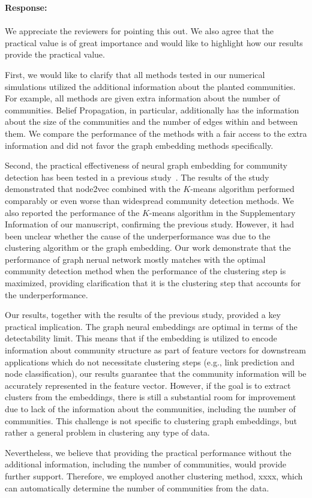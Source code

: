 \documentclass[12pt]{article}
\newcommand{\response}[1]{{\noindent \textbf{Response:} \\ \\ \noindent #1}}
\begin{document}
\response{
We appreciate the reviewers for pointing this out. We also agree that the practical value is of great importance and would like to highlight how our results provide the practical value.

First, we would like to clarify that all methods tested in our numerical simulations utilized the additional information about the planted communities. For example, all methods are given extra information about the number of communities. Belief Propagation, in particular, additionally has the information about the size of the communities and the number of edges within and between them. We compare the performance of the methods with a fair access to the extra information and did not favor the graph embedding methods specifically.

Second, the practical effectiveness of neural graph embedding for community detection has been tested in a previous study~\cite{tandonCommunityDetectionNetworks2021}. The results of the study demonstrated that node2vec combined with the $K$-means algorithm performed comparably or even worse than widespread community detection methods. We also reported the performance of the $K$-means algorithm in the Supplementary Information of our manuscript, confirming the previous study. However, it had been unclear whether the cause of the underperformance was due to the clustering algorithm or the graph embedding.
Our work demonstrate that the performance of graph nerual network mostly matches with the optimal community detection method when the performance of the clustering step is maximized, providing clarification that it is the clustering step that accounts for the underperformance. 

Our results, together with the results of the previous study, provided a key practical implication.  
The graph neural embeddings are optimal in terms of the detectability limit. This means that if the embedding is utilized to encode information about community structure as part of feature vectors for downstream applications  which do not necessitate clustering steps (e.g., link prediction and node classification), our results guarantee that the community information will be accurately represented in the feature vector.
However, if the goal is to extract clusters from the embeddings, there is still a substantial room for improvement due to lack of the information about the communities, including the number of communities. This challenge is not specific to clustering graph embeddings, but rather a general problem in clustering any type of data.

Nevertheless, we believe that providing the practical performance without the additional information, including the number of communities, would provide further support. Therefore, we employed another clustering method, xxxx, which can automatically determine the number of communities from the data.
}
\end{document}
